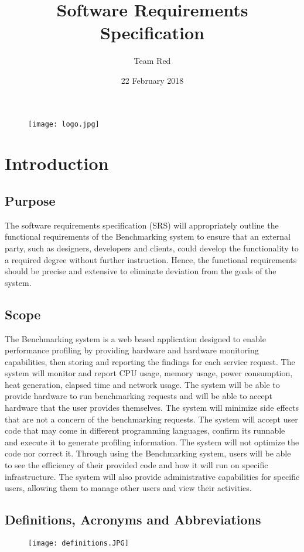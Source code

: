 \documentclass{article}
\title{Software Requirements Specification}
\date{22 February 2018}
\author{Team Red}
\begin{document}
    \begin{figure}[!t]
    	\centering
    	\texttt{[image: logo.jpg]}
    \end{figure}
	\maketitle
	\newpage
	\tableofcontents
	\newpage
	
	\section{Introduction}
	\subsection{Purpose}
    The software requirements speciﬁcation (SRS) will appropriately outline the functional requirements of the Benchmarking system to ensure that an external party, such as designers, developers and clients, could develop the functionality to a required degree without further instruction. Hence, the functional requirements should be precise and extensive to eliminate deviation from the goals of the system. 
	\subsection{Scope}
    The Benchmarking system is a web based application designed to enable performance profiling by providing hardware and hardware monitoring capabilities, then storing and reporting the findings for each service request. The system will monitor and report CPU usage, memory usage, power consumption, heat generation, elapsed time and network usage. The system will be able to provide hardware to run benchmarking requests and will be able to accept hardware that the user provides themselves. The system will minimize side effects that are not a concern of the benchmarking requests. The system will accept user code that may come in different programming languages, confirm its runnable and execute it to generate profiling information. The system will not optimize the code nor correct it. Through using the Benchmarking system, users will be able to see the efficiency of their provided code and how it will run on specific infrastructure. The system will also provide administrative capabilities for specific users, allowing them to manage other users and view their activities. 
	\subsection{Definitions, Acronyms and Abbreviations}
    \begin{figure}[ht!]
    	\texttt{[image: definitions.JPG]}
        \centering
	\end{figure}	
\end{document}
